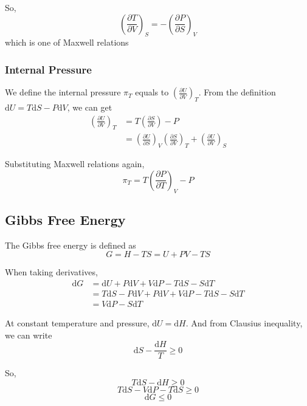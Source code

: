 \documentclass[letterpaper]{article}
\newcommand{\diff}{\mathrm{d}}
\begin{document}
So,
\begin{equation*}
    (\frac{\partial T}{\partial V})_S=-(\frac{\partial P}{\partial S})_V
\end{equation*}
which is one of Maxwell relations

\subsubsection*{Internal Pressure}
We define the internal pressure $\pi_T$ equals to $(\frac{\partial U}{\partial V})_T$.
From the definition $\diff U=T\diff S-P\diff V$, we can get
\begin{equation*}
    \begin{aligned}
        (\frac{\partial U}{\partial V})_T&=T(\frac{\partial S}{\partial V})-P\\
        &=(\frac{\partial U}{\partial S})_V(\frac{\partial S}{\partial V})_T+ (\frac{\partial U}{\partial V})_S
    \end{aligned}
\end{equation*}

Substituting Maxwell relations again,
\begin{equation*}
    \pi_T=T(\frac{\partial P}{\partial T})_V-P
\end{equation*}

\subsection*{Gibbs Free Energy}
The Gibbs free energy is defined as
\begin{equation*}
    G=H-TS=U+PV-TS
\end{equation*}

When taking derivatives,
\begin{equation*}
    \begin{aligned}
        \diff G&=\diff U+P\diff V+V\diff P-T\diff S-S\diff T\\
        &=T\diff S-P\diff V+P\diff V+V\diff P-T\diff S-S\diff T\\
        &=V\diff P-S\diff T
    \end{aligned}
\end{equation*}

At constant temperature and pressure, $\diff U=\diff H$.
And from Clausius inequality, we can write
\begin{equation*}
    \diff S-\frac{\diff H}{T}\geq0
\end{equation*}

So,
\begin{equation*}
    T\diff S-\diff H\geq0
\end{equation*}
\begin{equation*}
    T\diff S-V\diff P-T\diff S\geq0
\end{equation*}
\begin{equation*}
    \diff G\leq0
\end{equation*}
\end{document}
